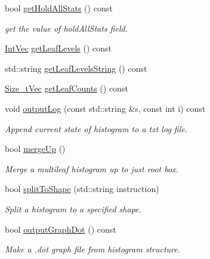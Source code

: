 \begin{DoxyCompactItemize}
bool \hyperlink{classsubpavings_1_1AdaptiveHistogramValidation_abfd3760f709336024357625903d9f2e9}{get\-Hold\-All\-Stats} () const 
\begin{DoxyCompactList}\small\item\em get the value of hold\-All\-Stats field. \end{DoxyCompactList}\item 
\hyperlink{namespacesubpavings_aed8e75b2af342b9c1460431c223dca8e}{\-Int\-Vec} \hyperlink{classsubpavings_1_1AdaptiveHistogramValidation_ab9672c3fe9ee4ced96a1ad03ee12c1c9}{get\-Leaf\-Levels} () const 
\item 
std\-::string \hyperlink{classsubpavings_1_1AdaptiveHistogramValidation_acba6350d62c4aa8c1d9de5589c039543}{get\-Leaf\-Levels\-String} () const 
\item 
\hyperlink{namespacesubpavings_a612fc5639b45583b9fd33bd304354f81}{\-Size\-\_\-t\-Vec} \hyperlink{classsubpavings_1_1AdaptiveHistogramValidation_a234fc6618948f692ea2458cedb4fed8f}{get\-Leaf\-Counts} () const 
\item 
void \hyperlink{classsubpavings_1_1AdaptiveHistogramValidation_a75453f853b530cd3e2a7afccf25e39d0}{output\-Log} (const std\-::string \&s, const int i) const 
\begin{DoxyCompactList}\small\item\em \-Append current state of histogram to a txt log file. \end{DoxyCompactList}\item 
bool \hyperlink{classsubpavings_1_1AdaptiveHistogramValidation_a30cd1199dfab7883a8191e501d372613}{merge\-Up} ()
\begin{DoxyCompactList}\small\item\em \-Merge a multileaf histogram up to just root box. \end{DoxyCompactList}\item 
bool \hyperlink{classsubpavings_1_1AdaptiveHistogramValidation_a7498bdc1663c857052e5bc147bf086f7}{split\-To\-Shape} (std\-::string instruction)
\begin{DoxyCompactList}\small\item\em \-Split a histogram to a specified shape. \end{DoxyCompactList}\item 
bool \hyperlink{classsubpavings_1_1AdaptiveHistogramValidation_a0286278b4e489ed8809dcb60d136dce7}{output\-Graph\-Dot} () const 
\begin{DoxyCompactList}\small\item\em \-Make a .dot graph file from histogram structure. \end{DoxyCompactList}\item 

\end{DoxyCompactItemize}
